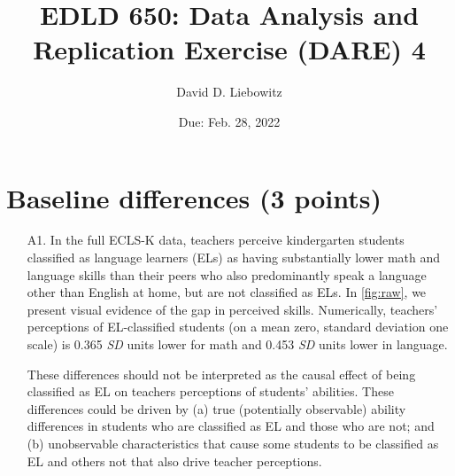 \documentclass[a4paper, 11pt]{article}
\title{EDLD 650: Data Analysis and Replication Exercise (DARE) 4}
\author{David D. Liebowitz}
\date{Due: Feb. 28, 2022}
\begin{document}
\maketitle



\section{Baseline differences  (3 points)}

\begin{enumerate}
	\item[A1.] In the full ECLS-K data, teachers perceive kindergarten students classified as language learners (ELs) as having substantially lower math and language skills than their peers who also predominantly speak a language other than English at home, but are not classified as ELs. In \autoref{fig:raw}, we present visual evidence of the gap in perceived skills. Numerically, teachers' perceptions of EL-classified students (on a mean zero, standard deviation one scale) is 0.365 \textit{SD} units lower for math and 0.453 \textit{SD} units lower in language. 
	
	These differences should not be interpreted as the causal effect of being classified as EL on teachers perceptions of students' abilities. These differences could be driven by (a) true (potentially observable) ability differences in students who are classified as EL and those who are not; and (b) unobservable characteristics that cause some students to be classified as EL and others not that also drive teacher perceptions.


\end{enumerate}
\end{document}
